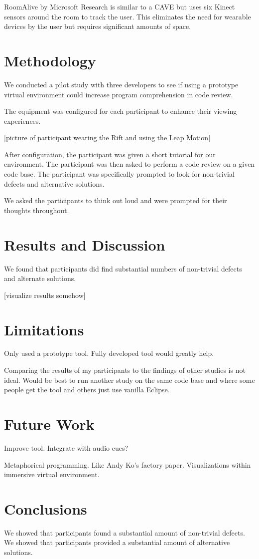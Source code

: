 \documentclass{acm_proc_article-sp}
\begin{document}
RoomAlive by Microsoft Research is similar to a CAVE but uses six Kinect sensors around the room to track the user.  This eliminates the need for wearable devices by the user but requires significant amounts of space.

\section{Methodology}
We conducted a pilot study with three developers to see if using a prototype virtual environment could increase program comprehension in code review.

The equipment was configured for each participant to enhance their viewing experiences. 

[picture of participant wearing the Rift and using the Leap Motion]

After configuration, the participant was given a short tutorial for our environment. The participant was then asked to perform a code review on a given code base. The participant was specifically prompted to look for non-trivial defects and alternative solutions.

We asked the participants to think out loud and were prompted for their thoughts throughout.

\section{Results and Discussion}
We found that participants did find substantial numbers of non-trivial defects and alternate solutions.

[visualize results somehow]

\section{Limitations}
Only used a prototype tool. Fully developed tool would greatly help.

Comparing the results of my participants to the findings of other studies is not ideal.  Would be best to run another study on the same code base and where some people get the tool and others just use vanilla Eclipse.
\section{Future Work}
Improve tool. Integrate with audio cues?

Metaphorical programming. Like Andy Ko's factory paper.
Visualizations within immersive virtual environment.
\section{Conclusions}
We showed that participants found a substantial amount of non-trivial defects.
We showed that participants provided a substantial amount of alternative solutions.


\end{document}
